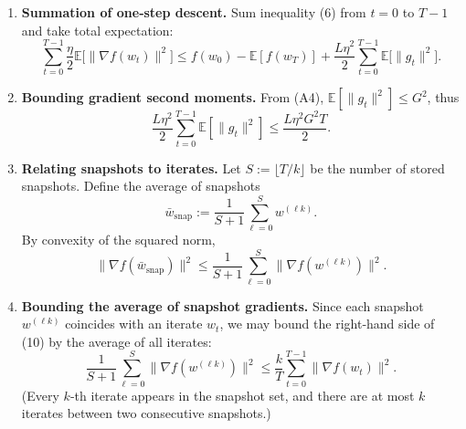 \documentclass{article}
\begin{document}
\begin{enumerate}[label=[Step \arabic*]]
\item \textbf{Summation of one‑step descent.}  
    Sum inequality (6) from $t=0$ to $T-1$ and take total expectation:
    \[
    \sum_{t=0}^{T-1}\frac{\eta}{2}\mathbb{E}\big[\|\nabla f(w_t)\|^{2}\big]
    \le f(w_0)-\mathbb{E}[f(w_T)]
    +\frac{L\eta^{2}}{2}\sum_{t=0}^{T-1}\mathbb{E}\big[\|g_t\|^{2}\big].
    \tag{7}
    \]
\item \textbf{Bounding gradient second moments.}  
    From (A4), $\mathbb{E}[\|g_t\|^{2}]\le G^{2}$, thus
    \[
    \frac{L\eta^{2}}{2}\sum_{t=0}^{T-1}\mathbb{E}[\|g_t\|^{2}]
    \le \frac{L\eta^{2}G^{2}T}{2}.
    \tag{8}
    \]
\item \textbf{Relating snapshots to iterates.}  
    Let $S:=\lfloor T/k\rfloor$ be the number of stored snapshots.
    Define the average of snapshots
    \[
    \bar w_{\text{snap}}:=\frac{1}{S+1}\sum_{\ell=0}^{S} w^{(\ell k)} .
    \tag{9}
    \]
    By convexity of the squared norm,
    \[
    \big\|\nabla f(\bar w_{\text{snap}})\big\|^{2}
    \le \frac{1}{S+1}\sum_{\ell=0}^{S}\|\nabla f(w^{(\ell k)})\|^{2}.
    \tag{10}
    \]
\item \textbf{Bounding the average of snapshot gradients.}  
    Since each snapshot $w^{(\ell k)}$ coincides with an iterate $w_t$,
    we may bound the right‑hand side of (10) by the average of all
    iterates:
    \[
    \frac{1}{S+1}\sum_{\ell=0}^{S}\|\nabla f(w^{(\ell k)})\|^{2}
    \le \frac{k}{T}\sum_{t=0}^{T-1}\|\nabla f(w_t)\|^{2}.
    \tag{11}
    \]
    (Every $k$‑th iterate appears in the snapshot set, and there are at
    most $k$ iterates between two consecutive snapshots.)


\end{enumerate}
\end{document}
